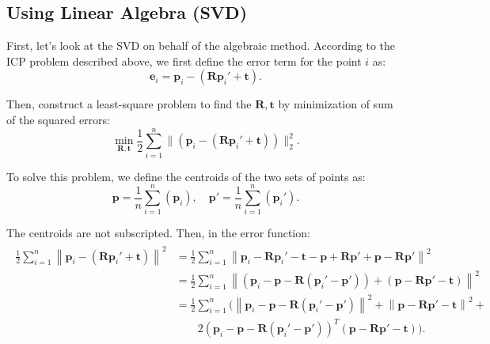 \subsection{Using Linear Algebra (SVD)}
First, let's look at the SVD on behalf of the algebraic method. According to the ICP problem described above, we first define the error term for the point $i$ as:
\begin{equation}
\mathbf{e}_i = \mathbf{p}_i - (\mathbf{R} \mathbf{p}_i' + \mathbf{t} ) .
\end{equation}

Then, construct a least-square problem to find the $\mathbf{R}, \mathbf{t}$ by minimization of sum of the squared errors:
\begin{equation}
\mathop {\min }\limits_{\mathbf{R}, \mathbf{t}} \frac{1}{2} \sum\limits_{i = 1}^n\| {\left( {{\mathbf{p}_i} - \left( {\mathbf{R}{\mathbf{p}_i}' + \mathbf{t}} \right)} \right)} \|^2_2.
\end{equation}

To solve this problem, we define the centroids of the two sets of points as:
\begin{equation}
\mathbf{p} = \frac{1}{n}\sum_{i=1}^n ( \mathbf{p}_i ), \quad \mathbf{p}' = \frac{1}{n} \sum_{i=1}^n ( \mathbf{p}_i' ). 
\end{equation}

The centroids are not subscripted. Then, in the error function:
\begin{align*}
\begin{array}{ll}
\frac{1}{2}\sum\limits_{i = 1}^n {{{\left\| {{\mathbf{p}_i} - \left( {\mathbf{R}{ \mathbf{p}_i}' + \mathbf{t}} \right)} \right\|}^2}}  & = \frac{1}{2}\sum\limits_{i = 1}^n {{{\left\| {{\mathbf{p}_i} - \mathbf{R}{\mathbf{p}_i}' - \mathbf{t} - \mathbf{p} + \mathbf{Rp}' + \mathbf{p} - \mathbf{Rp}'} \right\|}^2}} \\
 & = \frac{1}{2}\sum\limits_{i = 1}^n {{{\left\| {\left( {{\mathbf{p}_i} - \mathbf{p} - \mathbf{R}\left( {{\mathbf{p}_i}' - \mathbf{p}'} \right)} \right) + \left( {\mathbf{p} - \mathbf{Rp}' - \mathbf{t}} \right)} \right\|}^2}} \\
& = \frac{1}{2}\sum\limits_{i = 1}^n ( {{\left\| {{\mathbf{p}_i} - \mathbf{p} - \mathbf{R}\left( {{\mathbf{p}_i}' - \mathbf{p}'} \right)} \right\|}^2} + {{\left\| {\mathbf{p} - \mathbf{Rp}' - \mathbf{t}} \right\|}^2} +\\
 & \quad \quad 2{{\left( {{\mathbf{p}_i} - \mathbf{p} - \mathbf{R}\left( {{\mathbf{p}_i}' - \mathbf{p}'} \right)} \right)}^T}\left( {\mathbf{p} - \mathbf{Rp}' - \mathbf{t}} \right)). 
\end{array}
\end{align*}

